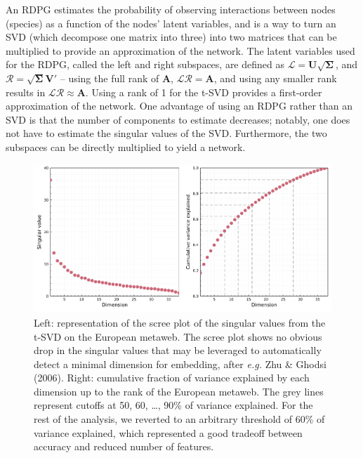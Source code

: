 \documentclass[11pt]{article}
\makeatletter
\def\maxwidth{\ifdim\Gin@nat@width>\linewidth\linewidth
\else\Gin@nat@width\fi}
\let\Oldincludegraphics\includegraphics
\renewcommand{\includegraphics}[1]{\Oldincludegraphics[width=\maxwidth]{#1}}
\makeatother
\begin{document}
An RDPG estimates the probability of observing interactions between
nodes (species) as a function of the nodes' latent variables, and is a
way to turn an SVD (which decompose one matrix into three) into two
matrices that can be multiplied to provide an approximation of the
network. The latent variables used for the RDPG, called the left and
right subspaces, are defined as
\(\mathscr{L} = \mathbf{U}\sqrt{\mathbf{\Sigma}}\), and
\(\mathscr{R} = \sqrt{\mathbf{\Sigma}}\mathbf{V}'\) -- using the full
rank of \(\mathbf{A}\), \(\mathscr{L}\mathscr{R} = \mathbf{A}\), and
using any smaller rank results in
\(\mathscr{L}\mathscr{R} \approx \mathbf{A}\). Using a rank of 1 for the
t-SVD provides a first-order approximation of the network. One advantage
of using an RDPG rather than an SVD is that the number of components to
estimate decreases; notably, one does not have to estimate the singular
values of the SVD. Furthermore, the two subspaces can be directly
multiplied to yield a network.

\begin{figure}
\hypertarget{fig:scree}{%
\centering
\includegraphics{figures/figure-screeplot.png}
\caption{Left: representation of the scree plot of the singular values
from the t-SVD on the European metaweb. The scree plot shows no obvious
drop in the singular values that may be leveraged to automatically
detect a minimal dimension for embedding, after \emph{e.g.} Zhu \&
Ghodsi (2006). Right: cumulative fraction of variance explained by each
dimension up to the rank of the European metaweb. The grey lines
represent cutoffs at 50, 60, \ldots, 90\% of variance explained. For the
rest of the analysis, we reverted to an arbitrary threshold of 60\% of
variance explained, which represented a good tradeoff between accuracy
and reduced number of features.}\label{fig:scree}
}
\end{figure}
\end{document}
